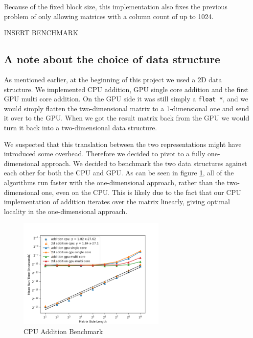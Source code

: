 Because of the fixed block size, this implementation also fixes the previous problem of only allowing matrices with a column count of up to 1024.

INSERT BENCHMARK

\subsection{A note about the choice of data structure}

As mentioned earlier, at the beginning of this project we used a 2D data structure. We implemented CPU addition, GPU single core addition and the first GPU multi core addition. On the GPU side it was still simply a \texttt{float *}, and we would simply flatten the two-dimensional matrix to a 1-dimensional one and send it over to the GPU. When we got the result matrix back from the GPU we would turn it back into a two-dimensional data structure. 

We suspected that this translation between the two representations might have introduced some overhead. Therefore we decided to pivot to a fully one-dimensional approach. We decided to benchmark the two data structures against each other for both the CPU and GPU. As can be seen in figure \ref{fig:1d_vs_2d_bench}, all of the algorithms run faster with the one-dimensional approach, rather than the two-dimensional one, even on the CPU. This is likely due to the fact that our CPU implementation of addition iterates over the matrix linearly, giving optimal locality in the one-dimensional approach.

\begin{figure}[ht]
    \centering
    \includegraphics[width=0.65\textwidth]{SavedBenchmarksAndDiagrams/Machine 2/2D vs 1D.png}
    \caption{CPU Addition Benchmark}
    \label{fig:1d_vs_2d_bench}
\end{figure}
